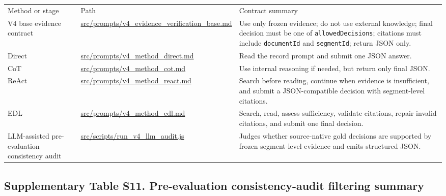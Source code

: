 \documentclass[
  8pt,
]{extarticle}
\begin{document}
\begin{center}
\begin{adjustbox}{max width=0.95\textwidth}
\begin{tabular}{@{}
lll@{}}
\toprule\noalign{}
Method or stage & Path & Contract summary \\

V4 base evidence contract &
\url{src/prompts/v4\_evidence\_verification\_base.md} & Use only
frozen evidence; do not use external knowledge; final decision must be
one of \texttt{allowedDecisions}; citations must include
\texttt{documentId} and \texttt{segmentId}; return JSON only. \\
Direct & \url{src/prompts/v4\_method\_direct.md} & Read the record
prompt and submit one JSON answer. \\
CoT & \url{src/prompts/v4\_method\_cot.md} & Use internal reasoning
if needed, but return only final JSON. \\
ReAct & \url{src/prompts/v4\_method\_react.md} & Search before
reading, continue when evidence is insufficient, and submit a
JSON-compatible decision with segment-level citations. \\
EDL & \url{src/prompts/v4\_method\_edl.md} & Search, read, assess
sufficiency, validate citations, repair invalid citations, and submit
one final decision. \\
LLM-assisted pre-evaluation consistency audit &
\url{src/scripts/run\_v4\_llm\_audit.js} & Judges whether
source-native gold decisions are supported by frozen segment-level
evidence and emits structured JSON. \\
\bottomrule
\end{tabular}
\end{adjustbox}
\end{center}

\hypertarget{supplementary-table-s11-pre-evaluation-consistency-audit-filtering-summary}{%
\subsection{Supplementary Table S11. Pre-evaluation consistency-audit
filtering
summary}\label{supplementary-table-s11-pre-evaluation-consistency-audit-filtering-summary}}
\end{document}
